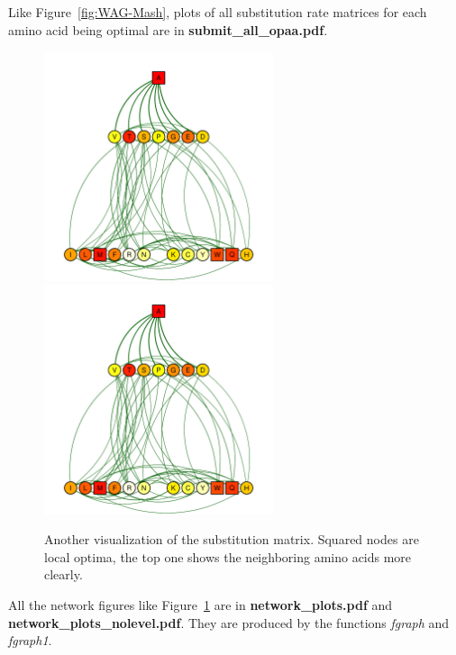 \documentclass[12pt]{article}
\begin{document}
Like Figure~\ref{fig:WAG-Mash}, plots of all substitution rate matrices for each amino acid being optimal are in {\bf submit\_all\_opaa.pdf}.
\begin{figure}[h]
\centering
\includegraphics[page=1,width=0.6\textwidth]{network_A.pdf}
\includegraphics[page=2,width=0.6\textwidth]{network_A.pdf}
\caption{Another visualization of the substitution matrix. Squared nodes are local optima, the top one shows the neighboring amino acids more clearly.}
\label{fig:network}
\end{figure}

All the network figures like Figure~\ref{fig:network} are in {\bf network\_plots.pdf} and {\bf network\_plots\_nolevel.pdf}. They are produced by the functions {\it fgraph} and {\it fgraph1}.
\end{document}
